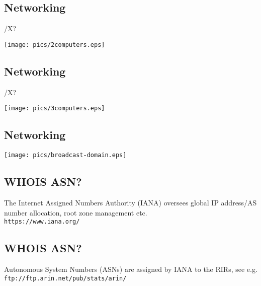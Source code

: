 \documentclass[xga]{xdvislides}
\begin{document}
\subsection{Networking}
/X? %
\vspace*{\fill}
\begin{center}
	\texttt{[image: pics/2computers.eps]} \\
\end{center}
\vspace*{\fill}

\subsection{Networking}
/X? %
\vspace*{\fill}
\begin{center}
	\texttt{[image: pics/3computers.eps]} \\
\end{center}
\vspace*{\fill}

\subsection{Networking}
\vspace*{\fill}
\begin{center}
	\texttt{[image: pics/broadcast-domain.eps]} \\
\end{center}
\vspace*{\fill}

\subsection{WHOIS ASN?}
\Huge
\vfill
\begin{center}
The Internet Assigned Numbers Authority (IANA) oversees global IP
address/AS number allocation, root zone management etc.
\\
\vspace{.5in}
\verb+https://www.iana.org/+
\end{center}
\vfill
\Normalsize

\subsection{WHOIS ASN?}
Autonomous System Numbers (ASNs) are assigned by IANA
to the RIRs, see e.g. {\tt
ftp://ftp.arin.net/pub/stats/arin/}
\\
\end{document}
